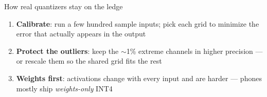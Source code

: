\begin{frame}{How real quantizers stay on the ledge}
  \vspace{0.6em}
  \raggedright
  \begin{enumerate}[<+->]\itemsep7pt
    \item \textbf{Calibrate}: run a few hundred sample inputs; pick each grid to
      minimize the error that actually appears in the output
    \item \textbf{Protect the outliers}: keep the $\sim$1\% extreme channels in
      higher precision --- or rescale them so the shared grid fits the rest
    \item \textbf{Weights first}: activations change with every input and are
      harder --- phones mostly ship \emph{weights-only} INT4
  \end{enumerate}

  \vspace{0.7em}
\end{frame}

